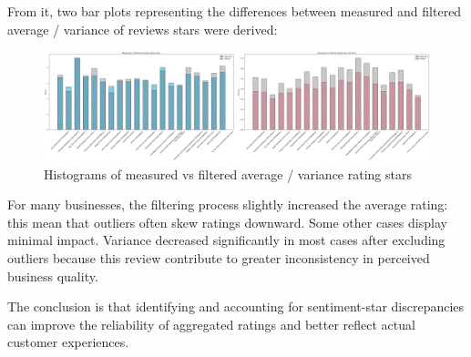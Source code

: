 \documentclass{Configuration_Files/PoliMi3i_thesis}
\begin{document}
\bigskip

From it, two bar plots representing the differences between measured and filtered average / variance of reviews stars were derived: 

\bigskip

\begin{figure}[H]
    \centering
    \includegraphics[width=\columnwidth]{imgs/query_11.png}
    \caption{Histograms of measured vs filtered average / variance rating stars}
    \label{fig:query_11}
\end{figure}

\bigskip

For many businesses, the filtering process slightly increased the average rating: this mean that outliers often skew ratings downward. Some other cases display minimal impact. Variance decreased significantly in most cases after excluding outliers because this review contribute to greater inconsistency in perceived business quality. 

The conclusion is that identifying and accounting for sentiment-star discrepancies can improve the reliability of aggregated ratings and better reflect actual customer experiences.

\listoffigures

\listoftables
\end{document}

